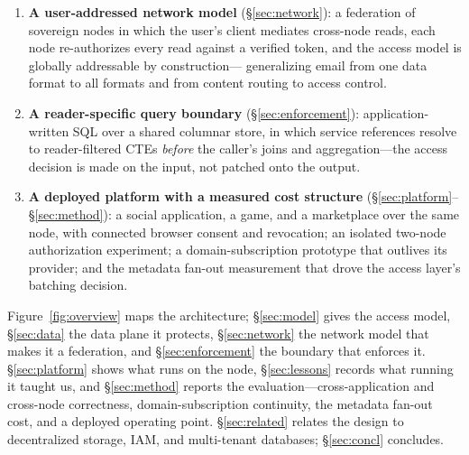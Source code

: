 \documentclass[sigconf, nonacm]{acmart}
\begin{document}
\begin{enumerate}[leftmargin=*,nosep]
  \item \textbf{A user-addressed network model} (\S\ref{sec:network}): a
  federation of sovereign nodes in which the user's client mediates
  cross-node reads, each node re-authorizes every read against a verified
  token, and the access model is globally addressable by construction---
  generalizing email from one data format to all formats and from content
  routing to access control.
  \item \textbf{A reader-specific query boundary} (\S\ref{sec:enforcement}):
  application-written SQL over a shared columnar store, in which service
  references resolve to reader-filtered CTEs \emph{before} the caller's joins
  and aggregation---the access decision is made on the input, not patched
  onto the output.
  \item \textbf{A deployed platform with a measured cost structure}
  (\S\ref{sec:platform}--\S\ref{sec:method}): a social application, a game,
  and a marketplace over the same node, with connected browser consent and
  revocation; an isolated two-node authorization experiment; a
  domain-subscription prototype that outlives its provider; and the
  metadata fan-out measurement that drove the access layer's batching
  decision.
\end{enumerate}

Figure~\ref{fig:overview} maps the architecture;
\S\ref{sec:model} gives the access model, \S\ref{sec:data} the data plane
it protects, \S\ref{sec:network} the network model that makes it a
federation, and \S\ref{sec:enforcement} the boundary that enforces it.
\S\ref{sec:platform} shows what runs on the node,
\S\ref{sec:lessons} records what running it taught us, and
\S\ref{sec:method} reports the evaluation---cross-application and
cross-node correctness, domain-subscription continuity, the metadata
fan-out cost, and a deployed operating point. \S\ref{sec:related} relates the
design to decentralized storage, IAM, and multi-tenant databases;
\S\ref{sec:concl} concludes.
\end{document}
